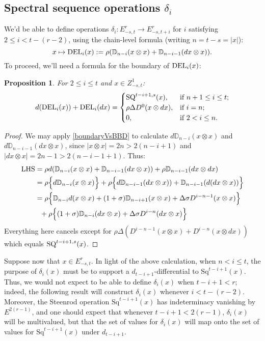 \documentclass[11pt]{amsart}
\theoremstyle{plain}
\newtheorem{prop}[thm]{Proposition}
\theoremstyle{definition}
\renewcommand{\to}{\longrightarrow}
\newcommand{\twist}{\sigma}
\theoremstyle{plain}
\newcommand{\Sq}{\mathrm{Sq}}
\begin{document}
\subsection{Spectral sequence operations $\delta_i$}
We'd be able to define operations $\delta_i:E^r_{-s,t}\to E^r_{-s,t+i}$ for $i$ satisfying $2\leq i<t-(r-2)$, using the chain-level formula (writing $n=t-s=|x|$):
\[x\mapsto \textup{DEL}_{i}(x):=\rho(\mathbb{D}_{n-i}(x\otimes x)+\mathbb{D}_{n-i-1}(dx\otimes x)).\]
To proceed, we'll need a formula for the boundary of $\textup{DEL}_i(x)$:
\begin{prop}
\label{dvsDEL}
For $2\leq i\leq t$ and $x\in Z^1_{-s,t}$:
\[d(\textup{DEL}_i(x))+ \textup{DEL}_i(dx)=\begin{cases}
\textup{SQ}^{t-i+1,s}(x),&\textup{if }n+1\leq i \leq t;\\
\rho\Delta D^0(x\otimes dx),&\textup{if }i=n;\\
0,&\textup{if }2< i\leq n.
\end{cases}\]
\end{prop}
\begin{proof}
We may apply \ref{boundaryVsBBD} to calculate $d\mathbb{D}_{n-i}(x\otimes x)$ and $d\mathbb{D}_{n-i-1}(dx\otimes x)$, since $|x\otimes x|=2n> 2(n-i+1)$ and $|dx\otimes x|=2n-1> 2(n-i-1+1)$. Thus:
\begin{alignat*}{2}
\textup{LHS}
&=
\rho d(\mathbb{D}_{n-i}(x\otimes x)+\mathbb{D}_{n-i-1}(dx\otimes x))+\rho\mathbb{D}_{n-i-1}(dx\otimes dx)%
\\
&=
\rho\Bigl\{d\mathbb{D}_{n-i}(x\otimes x)\Bigr\}+\rho\Bigl\{d\mathbb{D}_{n-i-1}(dx\otimes x))+\mathbb{D}_{n-i-1}(d(dx\otimes x))\Bigr\}%
\\
&=
\rho\Bigl\{\mathbb{D}_{n-i}d(x\otimes x)+(1+\twist)\mathbb{D}_{n-i+1}(x\otimes x)+\Delta\sigma D^{i-n-1}(x\otimes x)\Bigr\}
\\
&\ \ +\rho\Bigl\{(1+\twist)\mathbb{D}_{n-i}(dx\otimes x)+\Delta\sigma D^{i-n}(dx\otimes x)\Bigr\}
\end{alignat*}
Everything here cancels except for $\rho\Delta(D^{i-n-1}(x\otimes x)+D^{i-n}(x\otimes dx))$ which equals $\textup{SQ}^{t-i+1,s}(x)$.
\end{proof}
Suppose now that $x\in E^r_{-s,t}$. In light of the above calculation, when $n<i\leq t$, the purpose of $\delta_i(x)$ must be to support a $d_{t-i+1}$-differential to $\Sq^{t-i+1}(x)$. Thus, we would not expect to be able to define $\delta_i(x)$ when $t-i+1<r$; indeed, the following result will construct $\delta_i(x)$ whenever $i<t-(r-2)$. Moreover, the Steenrod operation $\Sq^{t-i+1}(x)$ has indeterminacy vanishing by $E^{2(r-1)}$, and one should expect that whenever $t-i+1<2(r-1)$, $\delta_i(x)$ will be multivalued, but that the set of values for $\delta_i(x)$ will map onto the set of values for $\Sq^{t-i+1}(x)$ under $d_{t-i+1}$.%
\end{document}
